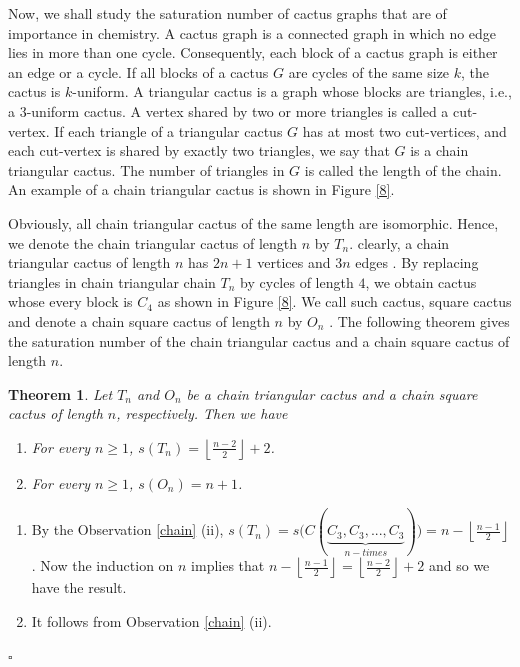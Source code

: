 \documentclass[11pt]{article}
\newtheorem{theorem}{Theorem}[section]
\newcommand{\proof}{\noindent{\bf Proof.\ }}
\newcommand{\qed}{\hfill $\square$\medskip}
\begin{document}
Now, we shall study the saturation number of cactus graphs that are of importance in chemistry. 
A cactus graph is a connected graph in which no edge lies in more than one cycle. Consequently, each block of a cactus graph is either an edge or a cycle. If all blocks of a cactus $G$ are cycles of the same size $k$, the cactus is $k$-uniform. 
A triangular cactus is a graph whose blocks are triangles, i.e., a $3$-uniform cactus. A vertex shared by two or more triangles is called a cut-vertex. If each triangle of a triangular cactus $G$ has at most two cut-vertices, and each cut-vertex is shared by exactly two triangles, we say that $G$ is a chain triangular cactus. The number of triangles in $G$ is called the length of the chain. An example of a chain triangular cactus is shown in Figure \ref{8}. 

Obviously, all chain triangular cactus of the same length are isomorphic. Hence, we denote the chain triangular cactus of length $n$ by $T_n$. clearly, a chain triangular cactus of length $n$ has $2n+1$ vertices and $3n$ edges \cite{Jah}. 
By replacing triangles in chain triangular chain $T_n$ by cycles of length $4$, we obtain cactus whose every block is $C_4$ as shown in Figure \ref{8}. We call such cactus, square cactus and denote a chain square cactus of length $n$ by $O_n$ \cite{Jah}. The following theorem gives the saturation number of the chain triangular cactus and a chain square cactus of length $n$.

\begin{theorem}
Let $T_n$ and $O_n$ be a chain triangular cactus and a chain square cactus of length $n$, respectively. Then we have 
     \begin{enumerate}
           \item [(i)] For every $n\geq 1$, $s(T_n)=\left\lfloor\frac{n-2}{2}\right\rfloor+2$.
           \item [(ii)] For every $n\geq 1$, $s(O_n)=n+1$.
     \end{enumerate}
\end{theorem}

\proof
     \begin{enumerate}
           \item [(i)] By the Observation \ref{chain} (ii), $s(T_n)=s\big(C(\underbrace{C_3, C_3, ..., C_3}_{n-times})\big)=n-\left\lfloor{\frac{n-1}{2}}\right\rfloor$. Now the induction on $n$ implies that 
$n-\left\lfloor{\frac{n-1}{2}}\right\rfloor=\left\lfloor{\frac{n-2}{2}}\right\rfloor+2$ and so we have the result.

           \item [(ii)] It follows from Observation \ref{chain} (ii).
     \end{enumerate}
\qed
\end{document}
